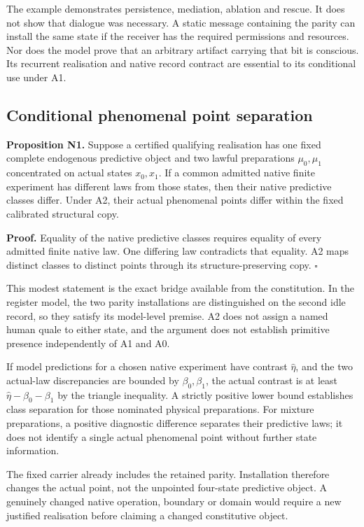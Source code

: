 \documentclass[
  11pt,
  a4paper,
]{article}
\begin{document}
The example demonstrates persistence, mediation, ablation and rescue. It
does not show that dialogue was necessary. A static message containing
the parity can install the same state if the receiver has the required
permissions and resources. Nor does the model prove that an arbitrary
artifact carrying that bit is conscious. Its recurrent realisation and
native record contract are essential to its conditional use under A1.

\subsection{Conditional phenomenal point
separation}\label{conditional-phenomenal-point-separation}

\textbf{Proposition N1.} Suppose a certified qualifying realisation has
one fixed complete endogenous predictive object and two lawful
preparations \(\mu_0,\mu_1\) concentrated on actual states \(x_0,x_1\).
If a common admitted native finite experiment has different laws from
those states, then their native predictive classes differ. Under A2,
their actual phenomenal points differ within the fixed calibrated
structural copy.

\textbf{Proof.} Equality of the native predictive classes requires
equality of every admitted finite native law. One differing law
contradicts that equality. A2 maps distinct classes to distinct points
through its structure-preserving copy. \(\square\)

This modest statement is the exact bridge available from the
constitution. In the register model, the two parity installations are
distinguished on the second idle record, so they satisfy its model-level
premise. A2 does not assign a named human quale to either state, and the
argument does not establish primitive presence independently of A1 and
A0.

If model predictions for a chosen native experiment have contrast
\(\widehat\eta\), and the two actual-law discrepancies are bounded by
\(\beta_0,\beta_1\), the actual contrast is at least
\(\widehat\eta-\beta_0-\beta_1\) by the triangle inequality. A strictly
positive lower bound establishes class separation for those nominated
physical preparations. For mixture preparations, a positive diagnostic
difference separates their predictive laws; it does not identify a
single actual phenomenal point without further state information.

The fixed carrier already includes the retained parity. Installation
therefore changes the actual point, not the unpointed four-state
predictive object. A genuinely changed native operation, boundary or
domain would require a new justified realisation before claiming a
changed constitutive object.
\end{document}

